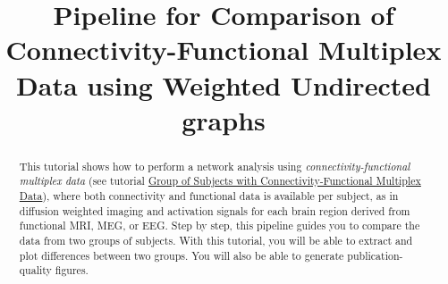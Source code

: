 \documentclass[justified]{tufte-handout}
\title{Pipeline for Comparison of Connectivity-Functional Multiplex Data using Weighted Undirected graphs}
\begin{document}
\maketitle

\begin{abstract}
\noindent
This tutorial shows how to perform a network analysis using \emph{connectivity-functional multiplex data} (see tutorial \href{https://github.com/braph-software/BRAPH-2/tree/develop/tutorials/general/tut_gr_con_fun_mp}{Group of Subjects with Connectivity-Functional Multiplex Data}), where both connectivity and functional data is available per subject, as in diffusion weighted imaging and activation signals for each brain region derived from functional MRI, MEG, or EEG. Step by step, this pipeline guides you to compare the data from two groups of subjects.  With this tutorial, you will be able to extract and plot differences between two groups. You will also be able to generate publication-quality figures.
\end{abstract}
\end{document}

